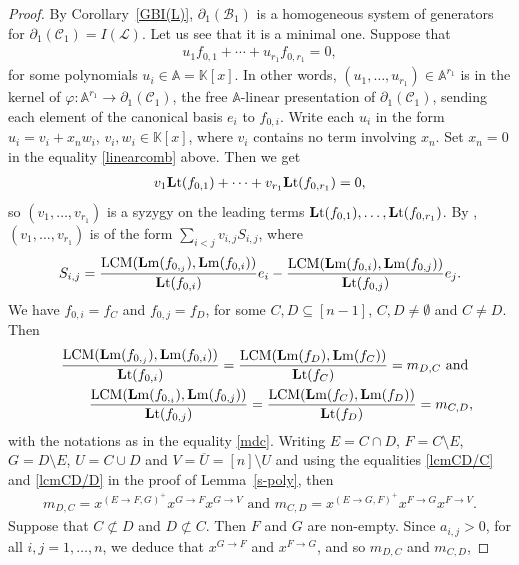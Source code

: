 \documentclass[ALCO]{cedram}
\newcommand{\mbk}{\mbox{$\mathbb{K}$}}
\newcommand{\mba}{\mbox{$\mathbb{A}$}}
\newcommand{\lm}{\mbox{${\bf L}{\rm m}$}}
\newcommand{\lt}{\mbox{${\bf L}{\rm t}$}}
\newcommand{\mcb}{\mbox{$\mathcal{B}$}}
\newcommand{\mcc}{\mbox{$\mathcal{C}$}}
\newcommand{\mcl}{\mbox{$\mathcal{L}$}}
\newcommand{\dif}{\mbox{$\partial$}}
\newcommand{\Lcm}{\mbox{${\rm LCM}$}}
\begin{document}
\begin{proof}
By Corollary~\ref{GBI(L)}, $\dif_1(\mcb_1)$ is a homogeneous system of
generators for $\dif_1(\mcc_1)=I(\mcl)$. Let us see that it is a
minimal one.  Suppose that
\begin{eqnarray}\label{linearcomb}
u_1f_{0,1}+\cdots +u_{r_1}f_{0,r_1}=0,
\end{eqnarray}
for some polynomials $u_i\in \mba=\mbk[x]$. In other words,
$(u_1,\ldots ,u_{r_1})\in\mba^{r_1}$ is in the kernel of
$\varphi:\mba^{r_1}\to \dif_1(\mcc_1)$, the free $\mba$-linear
presentation of $\dif_1(\mcc_1)$, sending each element of the
canonical basis $e_i$ to $f_{0,i}$. Write each $u_i$ in the form
$u_i=v_i+x_nw_i$, $v_i,w_i\in\mbk[x]$, where $v_i$ contains no term
involving $x_n$. Set $x_n=0$ in the equality \eqref{linearcomb}
above. Then we get
\begin{eqnarray*}
v_1\lt(f_{0,1})+\cdots + v_{r_1}\lt(f_{0,r_1})=0,
\end{eqnarray*}
so $(v_1,\ldots ,v_{r_1})$ is a syzygy on the leading terms
$\lt(f_{0,1}),\ldots ,\lt(f_{0,r_1})$.  By
\cite[\S~2.9. Proposition~8, see also Definition~5]{clo}, $(v_1,\ldots
,v_{r_1})$ is of the form $\sum_{i<j}v_{i,j}S_{i,j}$, where
\begin{eqnarray*}
S_{i,j}=\frac{\Lcm(\lm(f_{0,_j}),\lm(f_{0,i}))}{\lt(f_{0,i})}e_i-
\frac{\Lcm(\lm(f_{0,i}),\lm(f_{0,j}))}{\lt(f_{0,j})}e_j.
\end{eqnarray*}
We have $f_{0,i}=f_C$ and $f_{0,j}=f_D$, for some $C,D\subseteq
[n-1]$, $C,D\neq \emptyset$ and $C\neq D$. Then
\begin{eqnarray*}
&&\frac{\Lcm(\lm(f_{0,_j}),\lm(f_{0,i}))}{\lt(f_{0,i})}=
\frac{\Lcm(\lm(f_D),\lm(f_C))}{\lt(f_C)}=m_{D,C}\mbox{ and }
\\&& \frac{\Lcm(\lm(f_{0,_i}),\lm(f_{0,j}))}{\lt(f_{0,j})}=
\frac{\Lcm(\lm(f_C),\lm(f_D))}{\lt(f_D)}=m_{C,D},
\end{eqnarray*}
with the notations as in the equality \eqref{mdc}. Writing $E=C\cap
D$, $F=C\setminus E$, $G=D\setminus E$, $U=C\cup D$ and
$V=\overline{U}=[n]\setminus U$ and using the equalities
\eqref{lcmCD/C} and \eqref{lcmCD/D} in the proof of
Lemma~\ref{s-poly}, then
\begin{eqnarray*}
m_{D,C}=x^{(E\to F,G)^{+}}x^{G\to F}x^{G\to V}\mbox{ and }
m_{C,D}=x^{(E\to G,F)^{+}}x^{F\to G}x^{F\to V}.
\end{eqnarray*}
Suppose that $C\not\subset D$ and $D\not\subset C$. Then $F$ and $G$
are non-empty. Since $a_{i,j}>0$, for all $i,j=1,\ldots ,n$, we deduce
that $x^{G\to F}$ and $x^{F\to G}$, and so $m_{D,C}$ and $m_{C,D}$,

\end{proof}
\end{document}
